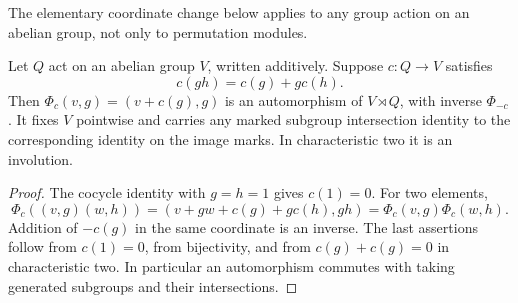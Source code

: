 The elementary coordinate change below applies to any group action on
an abelian group, not only to permutation modules.
\begin{lemma}\label{M-lem:shear}
Let $Q$ act on an abelian group $V$, written additively. Suppose
$c:Q\to V$ satisfies
\[
 c(gh)=c(g)+g c(h).
\]
Then $\Phi_c(v,g)=(v+c(g),g)$ is an automorphism of $V\rtimes Q$,
with inverse $\Phi_{-c}$. It fixes $V$ pointwise and carries any marked
subgroup intersection identity to the corresponding identity on the
image marks. In characteristic two it is an involution.
\end{lemma}
\begin{proof}
The cocycle identity with $g=h=1$ gives $c(1)=0$. For two elements,
\[
 \Phi_c((v,g)(w,h))=(v+gw+c(g)+gc(h),gh)
 =\Phi_c(v,g)\Phi_c(w,h).
\]
Addition of $-c(g)$ in the same coordinate is an inverse. The last
assertions follow from $c(1)=0$, from bijectivity, and from
$c(g)+c(g)=0$ in characteristic two. In particular an automorphism
commutes with taking generated subgroups and their intersections.
\end{proof}

